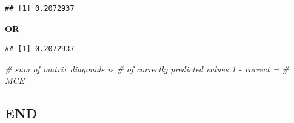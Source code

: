 \documentclass[]{article}
\newenvironment{Shaded}{\begin{snugshade}}{\end{snugshade}}
\newcommand{\KeywordTok}[1]{\textcolor[rgb]{0.13,0.29,0.53}{\textbf{#1}}}
\newcommand{\DecValTok}[1]{\textcolor[rgb]{0.00,0.00,0.81}{#1}}
\newcommand{\FloatTok}[1]{\textcolor[rgb]{0.00,0.00,0.81}{#1}}
\newcommand{\StringTok}[1]{\textcolor[rgb]{0.31,0.60,0.02}{#1}}
\newcommand{\CommentTok}[1]{\textcolor[rgb]{0.56,0.35,0.01}{\textit{#1}}}
\newcommand{\OperatorTok}[1]{\textcolor[rgb]{0.81,0.36,0.00}{\textbf{#1}}}
\newcommand{\NormalTok}[1]{#1}
\begin{document}
\begin{verbatim}
## [1] 0.2072937
\end{verbatim}

\textbf{OR}

\begin{Shaded}
\end{Shaded}

\begin{verbatim}
## [1] 0.2072937
\end{verbatim}

\begin{Shaded}
\begin{Highlighting}[]
\CommentTok{# sum of matrix diagonals is # of correctly predicted values 1 - correct =}
\CommentTok{# MCE}
\end{Highlighting}
\end{Shaded}

\vspace{.5in}

\subsection{END}\label{end}
\end{document}
